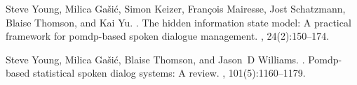 \documentclass[11pt]{article}
\begin{document}
\begin{thebibliography}{}
	Steve Young, Milica Ga{\v{s}}i{\'c}, Simon Keizer, Fran{\c{c}}ois Mairesse,
	Jost Schatzmann, Blaise Thomson, and Kai Yu.
	.
	\newblock The hidden information state model: A practical framework for
	pomdp-based spoken dialogue management.
	, 24(2):150--174.
	
	Steve Young, Milica Ga{\v{s}}i{\'c}, Blaise Thomson, and Jason~D Williams.
	.
	\newblock Pomdp-based statistical spoken dialog systems: A review.
	, 101(5):1160--1179.
	
\end{thebibliography}
\end{document}
